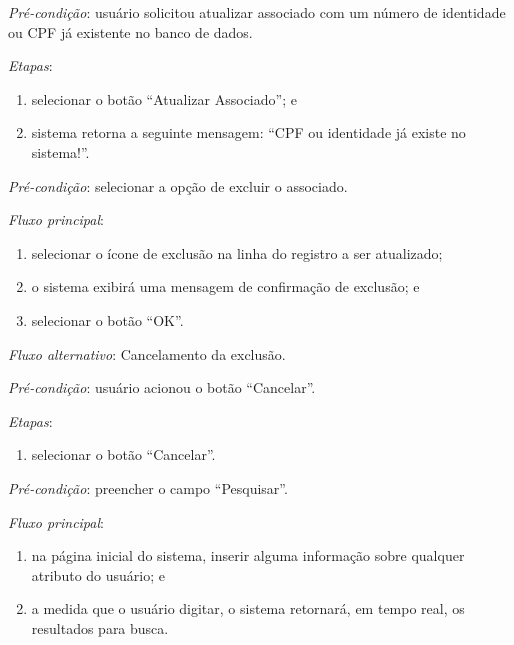 \noindent \textit{Pré-condição}: usuário solicitou atualizar associado com um número de identidade ou CPF já existente no banco de dados.

\noindent \textit{Etapas}:

\begin{enumerate}
    \item selecionar o botão ``Atualizar Associado''; e
    \item sistema retorna a seguinte mensagem: ``CPF ou identidade já existe no sistema!''.
\end{enumerate}



\vspace{0.7cm}

\noindent \textit{Pré-condição}: selecionar a opção de excluir o associado.

\noindent \textit{Fluxo principal}:

\begin{enumerate}
    \item selecionar o ícone de exclusão na linha do registro a ser atualizado;
    \item o sistema exibirá uma mensagem de confirmação de exclusão; e
    \item selecionar o botão ``OK''.
\end{enumerate}

\noindent \textit{Fluxo alternativo}: Cancelamento da exclusão.

\noindent \textit{Pré-condição}: usuário acionou o botão ``Cancelar''.

\noindent \textit{Etapas}:

\begin{enumerate}
    \item selecionar o botão ``Cancelar''.
\end{enumerate}


\vspace{0.7cm}

\noindent \textit{Pré-condição}: preencher o campo ``Pesquisar''.

\noindent \textit{Fluxo principal}:

\begin{enumerate}
    \item na página inicial do sistema, inserir alguma informação sobre qualquer atributo do usuário; e
    \item a medida que o usuário digitar, o sistema retornará, em tempo real, os resultados para busca.
\end{enumerate}

